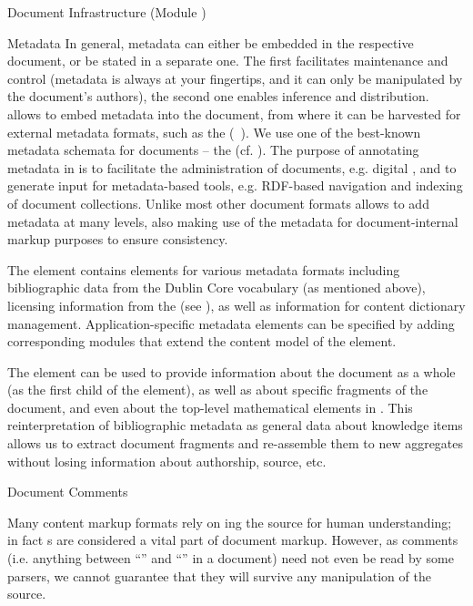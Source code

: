 \begin{tchapter}[id=omdoc-infrastructure,short=Document Infrastructure]{Document Infrastructure (Module {})}
\begin{tsection}[id=metadata]{Metadata}
  In general, metadata can either be embedded in the respective document, or be stated in
  a separate one. The first facilitates maintenance and control (metadata is always at
  your fingertips, and it can only be manipulated by the document's authors), the second
  one enables inference and distribution. {\omdoc} allows to embed metadata into the
  document, from where it can be harvested for external metadata formats, such as the
  {\xml} {}
  ({\rdf}~\cite{LasSwi:rdf99}).  We use one of the best-known metadata schemata for
  documents -- the {} (cf.  {}). The
  purpose of annotating metadata in {\omdoc} is to facilitate the administration of
  documents, e.g.  digital {}, and to generate input for
  metadata-based tools, e.g.  RDF-based navigation and indexing of document collections.
  Unlike most other document formats {\omdoc} allows to add metadata at many levels, also
  making use of the metadata for document-internal markup purposes to ensure consistency.
  
  The {} element contains elements for various metadata formats including
  bibliographic data from the Dublin Core vocabulary (as mentioned above), licensing
  information from the {} (see
  {}), as well as information for {\openmath} content dictionary
  management. Application-specific metadata elements can be specified by adding
  corresponding {\omdoc} modules that extend the content model of the {}
  element.

  The {\omdoc} {} element can be used to provide information about the
  document as a whole (as the first child of the {} element), as well as
  about specific fragments of the document, and even about the top-level mathematical
  elements in {\omdoc}. This reinterpretation of bibliographic metadata as general data
  about knowledge items allows us to extract document fragments and re-assemble them to
  new aggregates without losing information about authorship, source, etc.
\end{tsection}

\begin{tsection}[id=comments]{Document Comments}
  
  Many content markup formats rely on {ing} the source for human
  understanding; in fact {s} are considered a vital part of
  document markup. However, as {\xml} comments (i.e. anything between
  ``{}'' and ``{\snippetin{-->}}'' in a document) need not even be
  read by some {\xml} parsers, we cannot guarantee that they will
  survive any {\xml} manipulation of the {\omdoc} source.


\end{tsection}
\end{tchapter}

